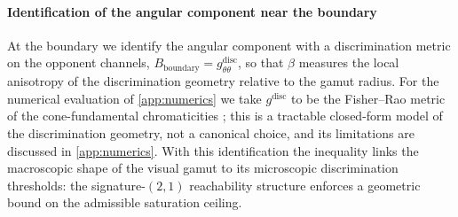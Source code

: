 \documentclass[preprint,12pt,authoryear]{elsarticle}
\theoremstyle{plain}
\theoremstyle{definition}
\theoremstyle{remark}
\begin{document}
\paragraph{Identification of the angular component near the boundary}
At the boundary we identify the angular component with a discrimination metric on the opponent channels, $B_{\mathrm{boundary}}=g_{\theta\theta}^{\mathrm{disc}}$, so that $\beta$ measures the local anisotropy of the discrimination geometry relative to the gamut radius. For the numerical evaluation of \ref{app:numerics} we take $g^{\mathrm{disc}}$ to be the Fisher--Rao metric of the cone-fundamental chromaticities \citep{Amari2016}; this is a tractable closed-form model of the discrimination geometry, not a canonical choice, and its limitations are discussed in \ref{app:numerics}. With this identification the inequality links the macroscopic shape of the visual gamut to its microscopic discrimination thresholds: the signature-$(2,1)$ reachability structure enforces a geometric bound on the admissible saturation ceiling.
\end{document}
